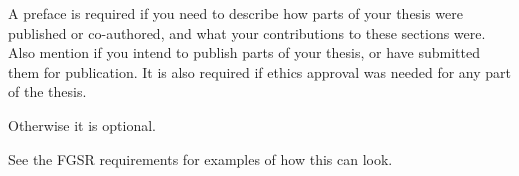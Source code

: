 \documentclass[\main/thesis.tex]{subfiles}
\begin{document}
\begin{preface}
A preface is required if you need to describe how parts of your thesis were
published or co-authored, and what your contributions to these sections were.
Also mention if you intend to publish parts of your thesis,
or have submitted them for publication. 
It is also required if ethics approval was needed for any part of the thesis.

Otherwise it is optional.

See the FGSR requirements for examples of how this can look.
\end{preface}
\end{document}
